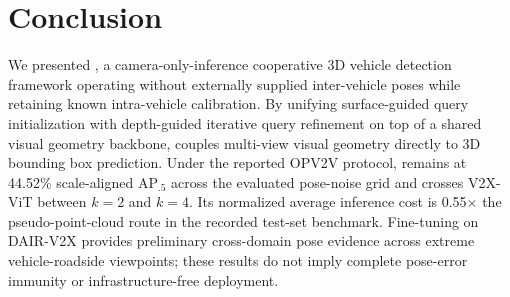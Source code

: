 \section{Conclusion}
We presented \method{}, a camera-only-inference cooperative 3D vehicle detection framework operating without externally supplied inter-vehicle poses while retaining known intra-vehicle calibration. By unifying surface-guided query initialization with depth-guided iterative query refinement on top of a shared visual geometry backbone, \method{} couples multi-view visual geometry directly to 3D bounding box prediction. Under the reported OPV2V protocol, \method{} remains at 44.52\% scale-aligned AP$_{.5}$ across the evaluated pose-noise grid and crosses V2X-ViT between $k=2$ and $k=4$. Its normalized average inference cost is 0.55$\times$ the pseudo-point-cloud route in the recorded test-set benchmark. Fine-tuning on DAIR-V2X provides preliminary cross-domain pose evidence across extreme vehicle-roadside viewpoints; these results do not imply complete pose-error immunity or infrastructure-free deployment.
